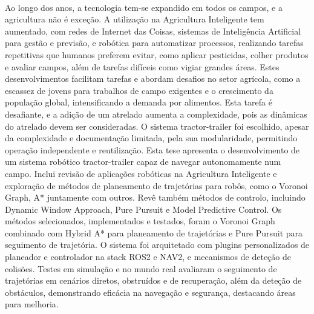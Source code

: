 
%

\paragraph{}Ao longo dos anos, a tecnologia tem-se expandido em todos 
os campos, e a agricultura não é exceção. A utilização na Agricultura 
Inteligente tem aumentado, com redes de Internet das Coisas, sistemas de
Inteligência Artificial para gestão e previsão, e robótica para 
automatizar processos, realizando tarefas repetitivas que humanos 
preferem evitar, como aplicar pesticidas, colher produtos e avaliar 
campos, além de tarefas difíceis como vigiar grandes áreas. Estes 
desenvolvimentos facilitam tarefas e abordam desafios no setor 
agrícola, como a escassez de jovens para trabalhos de campo exigentes e o 
crescimento da população global, intensificando a demanda por alimentos. 
Esta tarefa é desafiante, e a adição de um atrelado aumenta a 
complexidade, pois as dinâmicas do atrelado devem ser consideradas. O 
sistema tractor-trailer foi escolhido, apesar da complexidade e 
documentação limitada, pela sua modularidade, permitindo operação 
independente e reutilização. Esta tese apresenta o desenvolvimento de 
um sistema robótico tractor-trailer capaz de navegar autonomamente num 
campo. Inclui revisão de aplicações robóticas na Agricultura Inteligente e 
exploração de métodos de planeamento de trajetórias para robôs, como o 
Voronoi Graph, A* juntamente com outros. Revê também métodos de controlo, 
incluindo Dynamic Window Approach, Pure Pursuit e Model Predictive Control. 
Os métodos selecionados, implementados e testados, foram o Voronoi Graph 
combinado com Hybrid A* para planeamento de trajetórias e Pure Pursuit 
para seguimento de trajetória. O sistema foi arquitetado com plugins personalizados 
de planeador e controlador na stack ROS2 e NAV2, e mecanismos de 
deteção de colisões. Testes em simulação e no mundo real avaliaram o 
seguimento de trajetórias em cenários diretos, obstruídos e de 
recuperação, além da deteção de obstáculos, demonstrando eficácia na 
navegação e segurança, destacando áreas para melhoria.

